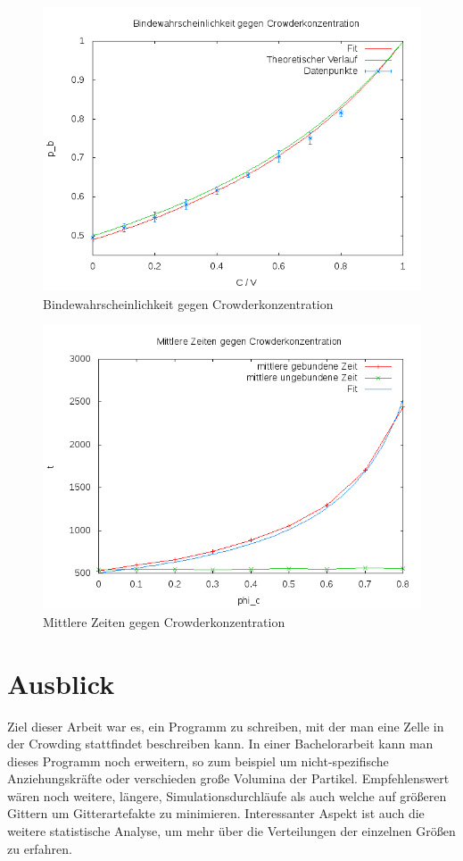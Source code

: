 \documentclass[bachelor,       %
               twoside,        %
               BCOR10mm,       %
               english,ngerman, %
               ]{GAUBM}
\begin{document}
\begin{figure}
  \centering
  \includegraphics[width=0.9\linewidth]{ProbgegenCrowder.png}
  \caption{Bindewahrscheinlichkeit gegen Crowderkonzentration}
  \label{fig:ProbGegenCrowder}
\end{figure}

\begin{figure}
  \centering
  \includegraphics[width=0.9\linewidth]{meantimes.png}
  \caption{Mittlere Zeiten gegen Crowderkonzentration}
  \label{fig:mean}
\end{figure}

\chapter{Ausblick}
Ziel dieser Arbeit war es, ein Programm zu schreiben, mit der man eine Zelle
in der Crowding stattfindet beschreiben kann. In einer Bachelorarbeit kann man
dieses Programm noch erweitern, so zum beispiel um nicht-spezifische Anziehungskräfte oder
verschieden große Volumina der Partikel. Empfehlenswert wären noch weitere, längere,
Simulationsdurchläufe als auch welche auf größeren Gittern um Gitterartefakte zu
minimieren. Interessanter Aspekt ist auch die weitere statistische Analyse, um mehr
über die Verteilungen der einzelnen Größen zu erfahren.
\end{document}
